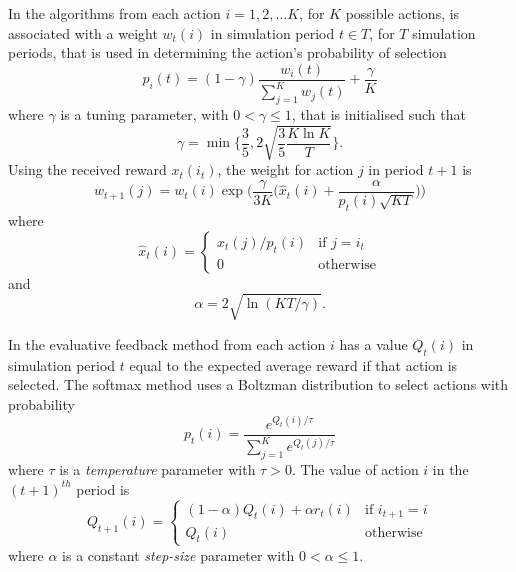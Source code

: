 In the algorithms from  each action $i = 1,2,\dotsc K$, for $K$
possible actions, is associated with a weight $w_t(i)$ in simulation period $t
\in T$, for $T$ simulation periods, that is used in
determining the action's probability of selection
\begin{equation}
p_i(t) = (1 - \gamma) \frac{w_i(t)}{\sum_{j=1}^K w_j(t)} + \frac{\gamma}{K}
\end{equation}
where $\gamma$ is a tuning parameter, with $0 < \gamma \leq 1$, that is
initialised such that
\begin{equation}
\gamma = \min \Biggl\lbrace \frac{3}{5}, 2\sqrt{\frac{3}{5} \frac{K\ln K}{T}}
\Biggr\rbrace .
\end{equation}
Using the received reward $x_t(i_t)$, the weight for action $j$ in period
$t+1$ is
\begin{equation}
w_{t+1}(j) = w_t(i) \exp \biggl(\frac{\gamma}{3K} \biggl(\hat{x}_t(i) +
\frac{\alpha}{p_t(i)\sqrt{KT}}\biggr)\biggr)
\end{equation}
where
\begin{equation}
\hat{x}_t(i) =
\begin{cases}
x_t(j)/p_t(i)& \text{if $j=i_t$}\\
0& \text{otherwise}
\end{cases}\end{equation}
and
\begin{equation}
\alpha = 2\sqrt{\ln(KT/\gamma)}.
\end{equation}

In the evaluative feedback method from  each action
$i$ has a value $Q_t(i)$ in simulation period $t$ equal to the expected average
reward if that action is selected.  The softmax method uses a Boltzman
distribution to select actions with probability
\begin{equation}
p_t(i) = \frac{e^{Q_t(i)/\tau}}{\sum_{j=1}^K e^{Q_t(j)/\tau}}
\end{equation}
where $\tau$ is a \textit{temperature} parameter with $\tau > 0$.  The value of
action $i$ in the $(t+1)^{th}$ period is
\begin{equation}
Q_{t+1}(i) = \begin{cases}
(1-\alpha)Q_t(i) + \alpha r_t(i) & \text{if $i_{t+1}=i$}\\
Q_t(i) & \text{otherwise}
\end{cases}
\end{equation}
where $\alpha$ is a constant \textit{step-size} parameter with $0 < \alpha
\leq 1$.

